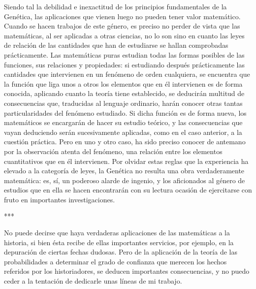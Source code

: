 \documentclass[a4paper, 12pt]{article}
\begin{document}
Siendo tal la debilidad e inexactitud de los principios fundamentales de la Genética, las aplicaciones que vienen luego no pueden tener valor matemático. Cuando se hacen trabajos de este género, es preciso no perder de vista que las matemáticas, al ser aplicadas a otras ciencias, no lo son sino en cuanto las leyes de relación de las cantidades que han de estudiarse se hallan comprobadas prácticamente. Las matemáticas puras estudian todas las formas posibles de las funciones, sus relaciones y propiedades: si estudiando después prácticamente las cantidades que intervienen en un fenómeno de orden cualquiera, se encuentra que la función que liga unos a otros los elementos que en él intervienen es de forma conocida, aplicando cuanto la teoría tiene establecido, se deducirán multitud de consecuencias que, traducidas al lenguaje ordinario, harán conocer otras tantas particularidades del fenómeno estudiado. Si dicha función es de forma nueva, los matemáticos se encargarán de hacer su estudio teórico, y las consecuencias que vayan deduciendo serán sucesivamente aplicadas, como en el caso anterior, a la cuestión práctica. Pero en uno y otro caso, ha sido preciso conocer de antemano por la observación atenta del fenómeno, una relación entre los elementos cuantitativos que en él intervienen. Por olvidar estas reglas que la experiencia ha elevado a la categoría de leyes, la Genética no resulta una obra verdaderamente matemática: es, sí, un poderoso alarde de ingenio, y los aficionados al género de estudios que en ella se hacen encontrarán con su lectura ocasión de ejercitarse con fruto en importantes investigaciones.

\bigskip

\centerline{***}


No puede decirse que haya verdaderas aplicaciones de las matemáticas a la historia, si bien ésta recibe de ellas importantes servicios, por ejemplo, en la depuración de ciertas fechas dudosas. Pero de la aplicación de la teoría de las probabilidades a determinar el grado de confianza que merecen los hechos referidos por los historiadores, se deducen importantes consecuencias, y no puedo ceder a la tentación de dedicarle unas líneas de mi trabajo.
\end{document}
